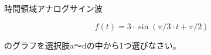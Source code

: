 時間領域アナログサイン波

\[
f(t) = 3 \cdot \sin( \pi/3 \cdot t + \pi/2)
\]

\bigskip
\noindent  のグラフを選択肢a〜dの中から1つ選びなさい。

